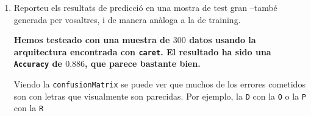 \documentclass[a4paper]{article}
\begin{document}
\begin{enumerate}
        \item Reporteu els resultats de predicció en una mostra de test gran --també generada per vosaltres, i de
        manera anàloga a la de training.

        {\bfseries
        Hemos testeado con una muestra de $300$ datos usando la arquitectura encontrada con \texttt{caret}. El resultado ha sido una \texttt{Accuracy} de $0.886$, que parece bastante bien.

        Viendo la \texttt{confusionMatrix} se puede ver que muchos de los errores cometidos son con letras que visualmente son parecidas. Por ejemplo, la \texttt{D} con la \texttt{O} o la \texttt{P} con la \texttt{R}


        }


    \end{enumerate}
\end{document}
